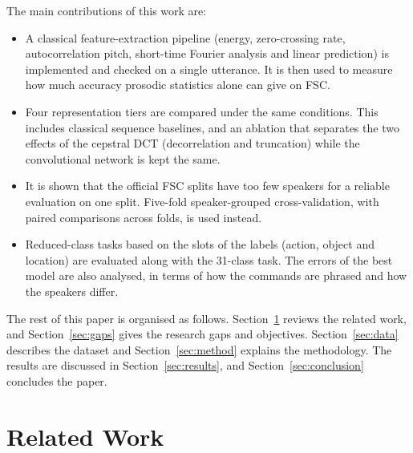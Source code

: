 \documentclass[conference]{IEEEtran}
\begin{document}
The main contributions of this work are:
\begin{itemize}
\item A classical feature-extraction pipeline (energy, zero-crossing rate, autocorrelation pitch, short-time Fourier analysis and linear prediction) is implemented and checked on a single utterance. It is then used to measure how much accuracy prosodic statistics alone can give on FSC.
\item Four representation tiers are compared under the same conditions. This includes classical sequence baselines, and an ablation that separates the two effects of the cepstral DCT (decorrelation and truncation) while the convolutional network is kept the same.
\item It is shown that the official FSC splits have too few speakers for a reliable evaluation on one split. Five-fold speaker-grouped cross-validation, with paired comparisons across folds, is used instead.
\item Reduced-class tasks based on the slots of the labels (action, object and location) are evaluated along with the 31-class task. The errors of the best model are also analysed, in terms of how the commands are phrased and how the speakers differ.
\end{itemize}

The rest of this paper is organised as follows. Section~\ref{sec:related} reviews the related work, and Section~\ref{sec:gaps} gives the research gaps and objectives. Section~\ref{sec:data} describes the dataset and Section~\ref{sec:method} explains the methodology. The results are discussed in Section~\ref{sec:results}, and Section~\ref{sec:conclusion} concludes the paper.

\section{Related Work}\label{sec:related}
\end{document}
